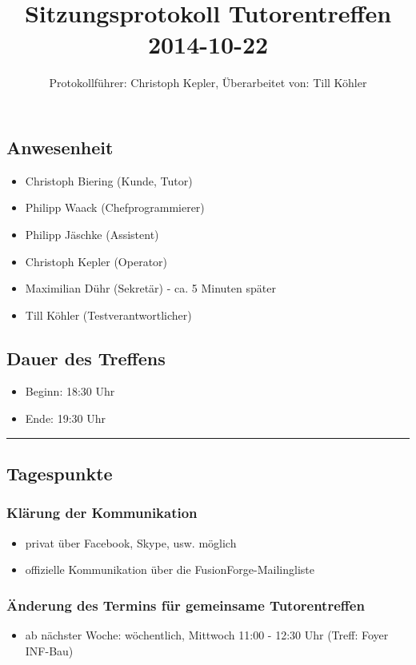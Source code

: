 \documentclass[12pt,a4paper]{article}
\author{Protokollführer: Christoph Kepler, Überarbeitet von: Till Köhler}
\title{Sitzungsprotokoll Tutorentreffen 2014-10-22}
\date{}
\begin{document}
\maketitle

\subsection*{Anwesenheit}
\medskip
\begin{itemize}
\item Christoph Biering (Kunde, Tutor)
\item Philipp Waack (Chefprogrammierer)
\item Philipp Jäschke (Assistent)
\item Christoph Kepler (Operator)
\item Maximilian Dühr (Sekretär) - ca. 5 Minuten später
\item Till Köhler (Testverantwortlicher)
\end{itemize}

\subsection*{Dauer des Treffens}
\medskip
\begin{itemize}
\item Beginn: 18:30 Uhr
\item Ende: 19:30 Uhr
\end{itemize}

\noindent\rule{\textwidth}{1pt}

\subsection*{Tagespunkte}
\medskip

\subsubsection*{Klärung der Kommunikation}
\begin{itemize}
\item privat über Facebook, Skype, usw. möglich
\item offizielle Kommunikation über die FusionForge-Mailingliste
\end{itemize}

\subsubsection*{Änderung des Termins für gemeinsame Tutorentreffen}
\begin{itemize}
\item ab nächster Woche: wöchentlich, Mittwoch 11:00 - 12:30 Uhr (Treff: Foyer INF-Bau)
\end{itemize}
\end{document}
